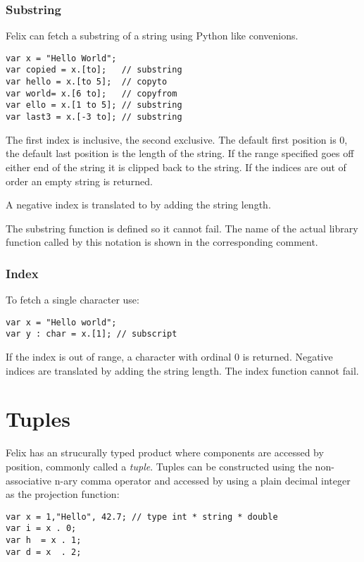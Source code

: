 \documentclass[oneside]{book}
\begin{document}
\subsubsection{Substring}
Felix can fetch a substring of a string using Python like convenions.

\begin{verbatim}
var x = "Hello World";
var copied = x.[to];   // substring
var hello = x.[to 5];  // copyto
var world= x.[6 to];   // copyfrom
var ello = x.[1 to 5]; // substring
var last3 = x.[-3 to]; // substring
\end{verbatim}

The first index is inclusive, the second exclusive. 
The default first position is 0, the default last
position is the length of the string. If the range specified
goes off either end of the string it is clipped back to the string.
If the indices are out of order an empty string is returned.

A negative index is translated to by adding the string length.

The substring function is defined so it cannot fail.
The name of the actual library function called by this notation
is shown in the corresponding comment.

\subsubsection{Index}
To fetch a single character use:

\begin{verbatim}
var x = "Hello world";
var y : char = x.[1]; // subscript
\end{verbatim}

If the index is out of range, a character with ordinal 0 is returned.
Negative indices are translated by adding the string length.
The index function cannot fail.

\section{Tuples}
Felix has an strucurally typed product where components are
accessed by position, commonly called a {\em tuple}.  Tuples
can be constructed using the non-associative n-ary comma operator
and accessed by using a plain decimal integer as the projection
function:

\begin{verbatim}
var x = 1,"Hello", 42.7; // type int * string * double
var i = x . 0;
var h  = x . 1;
var d = x  . 2;
\end{verbatim}
\end{document}
